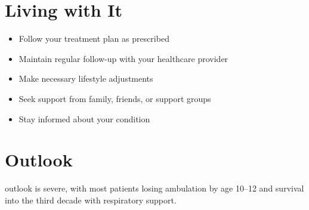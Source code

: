 \section{Living with It}
\begin{itemize}[noitemsep]
  \item Follow your treatment plan as prescribed
  \item Maintain regular follow-up with your healthcare provider
  \item Make necessary lifestyle adjustments
  \item Seek support from family, friends, or support groups
  \item Stay informed about your condition
\end{itemize}
\section{Outlook}
outlook is severe, with most patients losing ambulation by age 10--12 and survival into the third decade with respiratory support.
